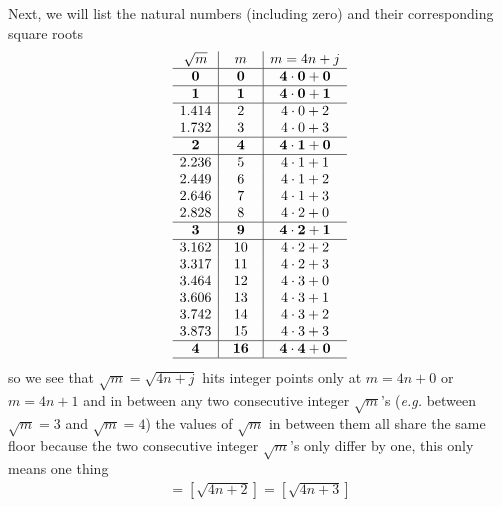 \documentclass[aps,preprint,preprintnumbers,nofootinbib,showpacs,prd]{revtex4-1}
\newcommand{\eg}{{\it e.g.} }
\newcommand{\nbea}{\begin{eqnarray*}}
\newcommand{\neea}{\end{eqnarray*}}
\begin{document}
Next, we will list  the natural numbers (including zero) and their corresponding square roots
%
\nbea
\begin{array}{c|c|c}
\sqrt{m} & ~~m~~ & m = 4n + j\\ \hline
{\bf 0} & {\bf 0} & {\bf 4\cdot0 + 0} \\ \hline
{\bf 1} & {\bf 1} & {\bf 4\cdot0 + 1} \\ \hline
1.414 & 2 & 4\cdot0 + 2 \\
1.732 & 3 & 4\cdot0 + 3 \\ \hline
{\bf 2} & {\bf 4} & {\bf 4\cdot1 + 0} \\ \hline
2.236 & 5 & 4\cdot1 + 1 \\
2.449 & 6 & 4\cdot1 + 2 \\
2.646 & 7 & 4\cdot1 + 3 \\
2.828 & 8 & 4\cdot2 + 0 \\ \hline
{\bf 3} & {\bf 9} & {\bf 4\cdot2 + 1} \\ \hline
3.162 & 10 & 4\cdot2 + 2 \\
3.317 & 11 & 4\cdot2 + 3 \\
3.464 & 12 & 4\cdot3 + 0 \\
3.606 & 13 & 4\cdot3 + 1 \\           
3.742 & 14 & 4\cdot3 + 2 \\           
3.873 & 15 & 4\cdot3 + 3 \\ \hline           
{\bf 4} & {\bf 16} & {\bf 4\cdot4 + 0} \\ \hline          
\end{array}
\neea
%
so we see that $\sqrt{m} = \sqrt{4n+j}$ hits integer points only at $m=4n+0$ or $m=4n+1$ and in between any two consecutive integer $\sqrt{m}$'s (\eg between $\sqrt{m} = 3$ and $\sqrt{m} = 4$) the values of $\sqrt{m}$ in between them all share the same floor because the two consecutive integer $\sqrt{m}$'s only differ by one, this only means one thing
%
\nbea
[\sqrt{4n+1}] = [\sqrt{4n+2}] = [\sqrt{4n+3}]
\neea
%
\end{document}
